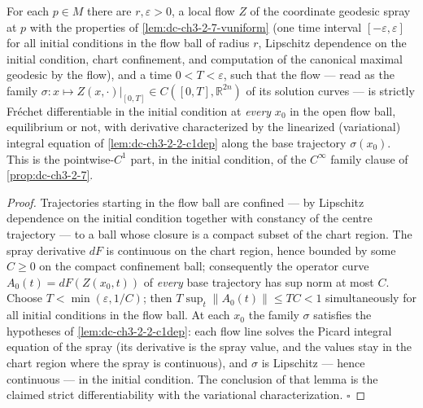 \begin{lemma}
  \label{lem:dc-ch3-2-7-c1flow}
  \leanok
  For each $p \in M$ there are $r, \varepsilon > 0$, a local flow $Z$ of the
  coordinate geodesic spray at $p$ with the properties of
  \cref{lem:dc-ch3-2-7-vuniform} (one time interval $[-\varepsilon,
  \varepsilon]$ for all initial conditions in the flow ball of radius $r$,
  Lipschitz dependence on the initial condition, chart confinement, and
  computation of the canonical maximal geodesic by the flow), and a time
  $0 < T < \varepsilon$, such that the flow — read as the family
  $\sigma : x \mapsto Z(x, \cdot)|_{[0,T]} \in C([0,T], \mathbb{R}^{2n})$ of
  its solution curves — is strictly Fr\'echet differentiable in the initial
  condition at \emph{every} $x_0$ in the open flow ball, equilibrium or not,
  with derivative characterized by the linearized (variational) integral
  equation of \cref{lem:dc-ch3-2-2-c1dep} along the base trajectory
  $\sigma(x_0)$. This is the pointwise-$C^1$ part, in the initial condition,
  of the $C^\infty$ family clause of \cref{prop:dc-ch3-2-7}.
\end{lemma}
\begin{proof}
  \leanok
  Trajectories starting in the flow ball are confined — by Lipschitz
  dependence on the initial condition together with constancy of the centre
  trajectory — to a ball whose closure is a compact subset of the chart
  region. The spray derivative $dF$ is continuous on the chart region, hence
  bounded by some $C \ge 0$ on the compact confinement ball; consequently the
  operator curve $A_0(t) = dF(Z(x_0, t))$ of \emph{every} base trajectory has
  sup norm at most $C$. Choose $T < \min(\varepsilon, 1/C)$; then
  $T \sup_t \|A_0(t)\| \le T C < 1$ simultaneously for all initial conditions
  in the flow ball. At each $x_0$ the family $\sigma$ satisfies the
  hypotheses of \cref{lem:dc-ch3-2-2-c1dep}: each flow line solves the Picard
  integral equation of the spray (its derivative is the spray value, and the
  values stay in the chart region where the spray is continuous), and
  $\sigma$ is Lipschitz — hence continuous — in the initial condition. The
  conclusion of that lemma is the claimed strict differentiability with the
  variational characterization. $\square$
\end{proof}

